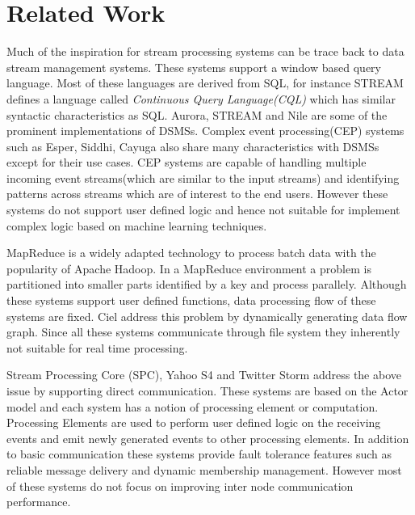 \section{Related Work}
Much of the inspiration for stream processing systems can be trace back to data stream management systems. These systems support a window based query language. Most of these languages are derived from SQL, for instance STREAM\cite{arasu2004stream} defines a language called \textit{Continuous Query Language(CQL)} which has similar syntactic characteristics as SQL. Aurora\cite{abadi2003aurora}, STREAM\cite{arasu2004stream} and Nile\cite{hammad2004nile} are some of the prominent implementations of DSMSs. Complex event processing(CEP) systems such as Esper\cite{esper}, Siddhi\cite{suhothayan2011siddhi}, Cayuga\cite{brenna2007cayuga} also share many characteristics with DSMSs except for their use cases. CEP systems are capable of handling multiple incoming event streams(which are similar to the input streams) and identifying patterns across streams which are of interest to the end users. However these systems do not support user defined logic and hence not suitable for implement complex logic based on machine 
learning techniques. 

MapReduce\cite{dean2008mapreduce} is a widely adapted technology to process batch data with the popularity of Apache Hadoop\cite{hadoop}. In a MapReduce environment a problem is partitioned into smaller parts identified by a key and process parallely. Although these systems support user defined functions, data processing flow of these systems are fixed. Ciel\cite{murray2011ciel} address this problem by dynamically generating data flow graph. Since all these systems communicate through file system they inherently not suitable for real time processing\cite{lam2012muppet}. 

Stream Processing Core (SPC)\cite{Amini2006}, Yahoo S4\cite{neumeyer2010s4} and Twitter Storm\cite{twitterStorm} address the above issue by supporting direct communication. These systems are based on the Actor model\cite{agha1985actors} and each system has a notion of processing element or computation. Processing Elements are used to perform user defined logic on the receiving events and emit newly generated events to other processing elements. In addition to basic communication these systems provide fault tolerance features such as reliable message delivery and dynamic membership management. However most of these systems do not focus on improving inter node communication performance.

